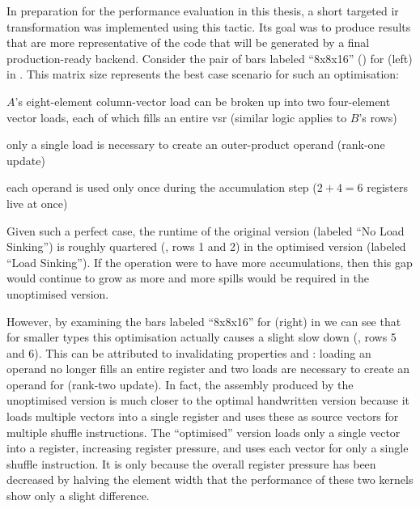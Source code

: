 \documentclass[\main/thesis.tex]{subfiles}
\begin{document}
In preparation for the performance evaluation in this thesis, a short targeted \gls{ir} transformation was implemented using this tactic.
Its goal was to produce results that are more representative of the code that will be generated by a final production-ready backend.
Consider the pair of bars labeled ``8x8x16'' () for  (left) in .
This matrix size represents the best case scenario for such an optimisation:
\begin{enumerate*}[itemjoin={{; }}, itemjoin*={{; and }}, label={\protect\circled{\arabic*}}, after={.}]
  \item $A$'s eight-element column-vector load can be broken up into two four-element vector loads, each of which fills an entire \gls{vsr} (similar logic applies to $B$'s rows)
  \item only a single load is necessary to create an outer-product operand (rank-one update)
  \item each operand is used only once during the accumulation step ($2+4=6$ registers \gls{live} at once)
\end{enumerate*}
Given such a perfect case, the runtime of the original version (labeled ``No Load Sinking'') is roughly quartered (, rows 1 and 2) in the optimised version (labeled ``Load Sinking'').
If the operation were to have more accumulations, then this gap would continue to grow as more and more spills would be required in the unoptimised version.

However, by examining the bars labeled ``8x8x16'' for  (right) in  we can see that for smaller types this optimisation actually causes a slight slow down (, rows 5 and 6).
This can be attributed to invalidating properties  and : loading an  operand no longer fills an entire register and two loads are necessary to create an operand for  (rank-two update).
In fact, the assembly produced by the unoptimised version is much closer to the optimal handwritten version because it loads multiple vectors into a single register and uses these as source vectors for multiple shuffle instructions.
The ``optimised'' version loads only a single vector into a register, increasing register pressure, and uses each vector for only a single shuffle instruction.
It is only because the overall register pressure has been decreased by halving the element width that the performance of these two kernels show only a slight difference.
\end{document}
